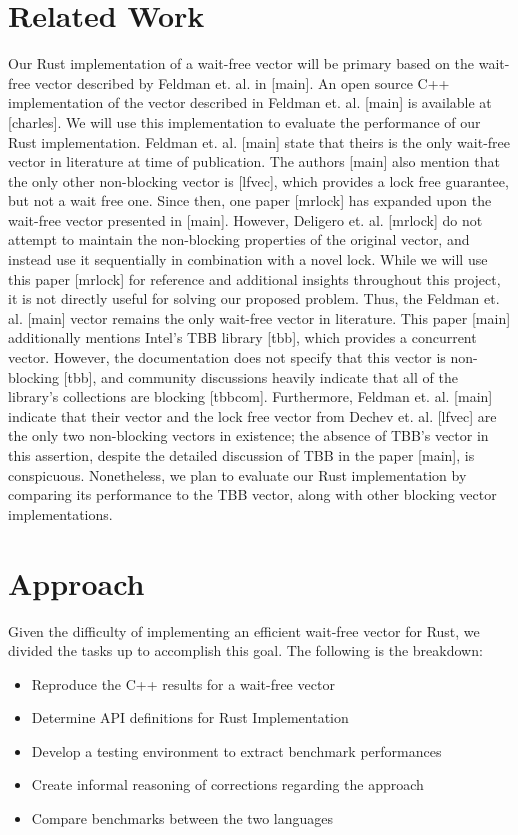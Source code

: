 \documentclass[conference]{IEEEtran}
\begin{document}
\section{Related Work}

Our Rust implementation of a wait-free vector will be primary based on the wait-free vector described by Feldman et. al. in [main]. An open source C++ implementation of the vector described in Feldman et. al. [main] is available at [charles]. We will use this implementation to evaluate the performance of our Rust implementation.
Feldman et. al. [main] state that theirs is the only wait-free vector in literature at time of publication. The authors [main] also mention that the only other non-blocking vector is [lfvec], which provides a lock free guarantee, but not a wait free one. Since then, one paper [mrlock] has expanded upon the wait-free vector presented in [main]. However, Deligero et. al. [mrlock] do not attempt to maintain the non-blocking properties of the original vector, and instead use it sequentially in combination with a novel lock. While we will use this paper [mrlock] for reference and additional insights throughout this project, it is not directly useful for solving our proposed problem. Thus, the Feldman et. al. [main] vector remains the only wait-free vector in literature. 
This paper [main] additionally mentions Intel’s TBB library [tbb], which provides a concurrent vector. However, the documentation does not specify that this vector is non-blocking [tbb], and community discussions heavily indicate that all of the library’s collections are blocking [tbbcom]. Furthermore, Feldman et. al. [main] indicate that their vector and the lock free vector from Dechev et. al. [lfvec] are the only two non-blocking vectors in existence; the absence of TBB’s vector in this assertion, despite the detailed discussion of TBB in the paper [main], is conspicuous. Nonetheless, we plan to evaluate our Rust implementation by comparing its performance to the TBB vector, along with other blocking vector implementations. 

\section{Approach}

Given the difficulty of implementing an efficient wait-free vector for Rust, we divided the tasks up to accomplish this goal. The following is the breakdown:

    \begin{itemize}
        \item Reproduce the C++ results for a wait-free vector
        \item Determine API definitions for Rust Implementation
        \item Develop a testing environment to extract benchmark performances
        \item Create informal reasoning of corrections regarding the approach
        \item Compare benchmarks between the two languages
    \end{itemize}
    
\end{document}
